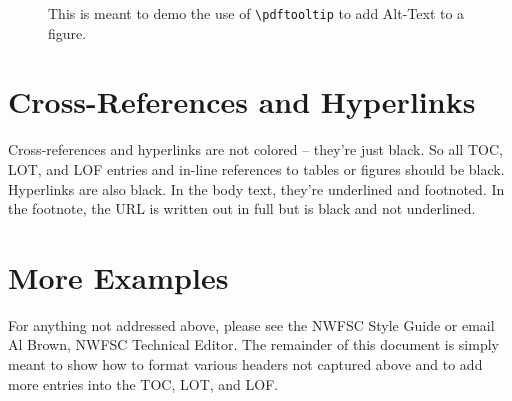 \documentclass[12pt]{article}
\begin{document}
\begin{figure}[!h]
\centering
\caption[Demo Alt-text]{This is meant to demo the use of \texttt{\textbackslash pdftooltip} to add Alt-Text to a figure.}
\label{fig:diamprice5k}
\end{figure}

\section{Cross-References and Hyperlinks}
Cross-references and hyperlinks are not colored -- they're just black. So all TOC, LOT, and LOF entries and in-line references to tables or figures should be black. Hyperlinks are also black. In the body text, they're underlined and footnoted. In the footnote, the URL is written out in full but is black and not underlined. 

\section{More Examples}
For anything not addressed above, please see the NWFSC Style Guide or email Al Brown, NWFSC Technical Editor.
The remainder of this document is simply meant to show how to format various headers not captured above and to add more entries into the TOC, LOT, and LOF.
\end{document}
